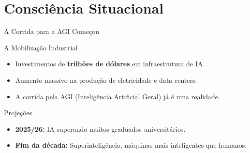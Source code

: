 \documentclass[aspectratio=169,12pt]{beamer}
\begin{document}

\section{Consciência Situacional}

\begin{frame}{A Corrida para a AGI Começou}
    \begin{block}{A Mobilização Industrial}
        \begin{itemize}
            \item Investimentos de \textbf{trilhões de dólares} em infraestrutura de IA.
            \item Aumento massivo na produção de eletricidade e data centers.
            \item A corrida pela AGI (Inteligência Artificial Geral) já é uma realidade.
        \end{itemize}
    \end{block}
    
    \begin{alertblock}{Projeções}
        \begin{itemize}
            \item \textbf{2025/26:} IA superando muitos graduados universitários.
            \item \textbf{Fim da década:} Superinteligência, máquinas mais inteligentes que humanos.
        \end{itemize}
    \end{alertblock}
\end{frame}
\end{document}
